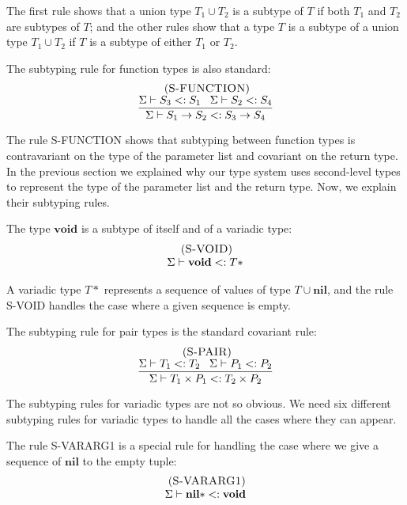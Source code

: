 \documentclass{sigplanconf}
\newcommand{\Nil}{\mathbf{nil}}
\newcommand{\Void}{\mathbf{void}}
\newcommand{\mylabel}[1]{\; (\textsc{#1})}
\newcommand{\senv}{\Sigma}
\newcommand{\subtype}{<:}
\begin{document}
The first rule shows that a union type $T_{1} \cup T_{2}$
is a subtype of $T$ if both $T_{1}$ and $T_{2}$ are subtypes
of $T$;
and the other rules show that a type $T$ is a subtype
of a union type $T_{1} \cup T_{2}$ if $T$ is a subtype of
either $T_{1}$ or $T_{2}$.

The subtyping rule for function types is also standard:
\[
\begin{array}{c}
\mylabel{S-FUNCTION}\\
\dfrac{\senv \vdash S_{3} \subtype S_{1} \;\;\;
       \senv \vdash S_{2} \subtype S_{4}}
      {\senv \vdash S_{1} \rightarrow S_{2} \subtype S_{3} \rightarrow S_{4}}
\end{array}
\]

The rule \textsc{S-FUNCTION} shows that subtyping between
function types is contravariant on the type of the parameter list
and covariant on the return type.
In the previous section we explained why our type system uses
second-level types to represent the type of the parameter list
and the return type.
Now, we explain their subtyping rules.

The type $\Void$ is a subtype of itself and of a variadic type:
\[
\begin{array}{c}
\mylabel{S-VOID}\\
\senv \vdash \Void \subtype T{*}
\end{array}
\]

A variadic type $T{*}$ represents a sequence of values of type
$T \cup \Nil$, and the rule \textsc{S-VOID} handles the case where
a given sequence is empty.

The subtyping rule for pair types is the standard covariant rule:
\[
\begin{array}{c}
\mylabel{S-PAIR}\\
\dfrac{\senv \vdash T_{1} \subtype T_{2} \;\;\;
       \senv \vdash P_{1} \subtype P_{2}}
      {\senv \vdash T_{1} \times P_{1} \subtype T_{2} \times P_{2}}
\end{array}
\]

The subtyping rules for variadic types are not so obvious.
We need six different subtyping rules for variadic types
to handle all the cases where they can appear.

The rule \textsc{S-VARARG1} is a special rule for handling the
case where we give a sequence of $\Nil$ to the empty tuple:
\[
\begin{array}{c}
\mylabel{S-VARARG1}\\
\senv \vdash \Nil{*} \subtype \Void
\end{array}
\]
\end{document}
